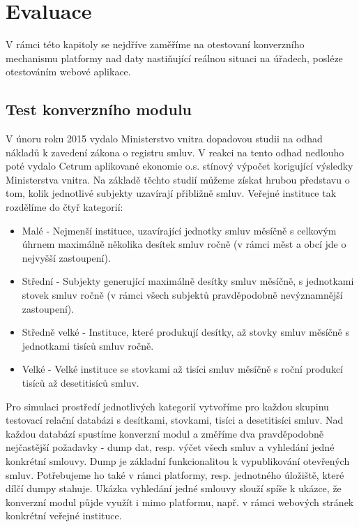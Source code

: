 \chapter{Evaluace}

V rámci této kapitoly se nejdříve zaměříme na otestovaní konverzního mechanismu platformy nad daty nastiňující reálnou situaci na úřadech, posléze otestováním webové aplikace.

\section{Test konverzního modulu}

V únoru roku 2015 vydalo Ministerstvo vnitra dopadovou studii na odhad nákladů k zavedení zákona o registru smluv\cite{dopad}. V reakci na tento odhad nedlouho poté vydalo Cetrum aplikované ekonomie o.s. stínový výpočet korigující výsledky Ministerstva vnitra\cite{stinovyvypocet}. Na základě těchto studií můžeme získat hrubou představu o tom, kolik jednotlivé subjekty uzavírají přibližně smluv. Veřejné instituce tak rozdělíme do čtyř kategorií:  

\begin{itemize}
\item Malé - Nejmenší instituce, uzavírající jednotky smluv měsíčně s celkovým úhrnem maximálně několika desítek smluv ročně (v rámci měst a obcí jde o nejvyšší zastoupení).
\item Střední - Subjekty generující maximálně desítky smluv měsíčně, s jednotkami stovek smluv ročně (v rámci všech subjektů pravděpodobně nevýznamnější zastoupení). 
\item Středně velké - Instituce, které produkují desítky, až stovky smluv měsíčně s jednotkami tisíců smluv ročně.
\item Velké - Velké instituce se stovkami až tisíci smluv měsíčně s roční produkcí tisíců až desetitisíců smluv.
\end{itemize}

Pro simulaci prostředí jednotlivých kategorií vytvoříme pro každou skupinu testovací relační databázi s desítkami, stovkami, tisíci a desetitisíci smluv. Nad každou databází spustíme konverzní modul a změříme dva pravděpodobně nejčastější požadavky - dump dat, resp. výčet všech smluv a vyhledání jedné konkrétní smlouvy. Dump je základní funkcionalitou k vypublikování otevřených smluv. Potřebujeme ho také v rámci platformy, resp. jednotného úložiště, které dílčí dumpy stahuje. Ukázka vyhledání jedné smlouvy slouží spíše k ukázce, že konverzní modul půjde využít i mimo platformu, např. v rámci webových stránek konkrétní veřejné instituce.   

